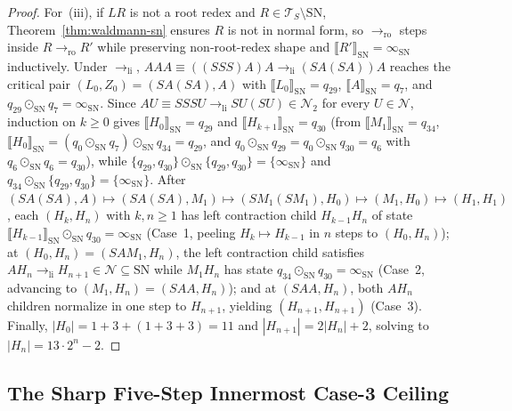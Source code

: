 \documentclass[11pt,reqno]{amsart}
\numberwithin{equation}{section}
\theoremstyle{plain}
\theoremstyle{definition}
\theoremstyle{remark}
\begin{document}
\begin{proof}
For~(iii), if $L R$ is not a root redex and $R \in \mathcal{T}_S \setminus \mathrm{SN}$, Theorem~\ref{thm:waldmann-sn} ensures $R$ is not in normal form, so $\to_{\mathrm{ro}}$ steps inside $R \to_{\mathrm{ro}} R'$ while preserving non-root-redex shape and $\llbracket R' \rrbracket_{\mathrm{SN}} = \infty_{\mathrm{SN}}$ inductively. Under $\to_{\mathrm{li}}$, $A A A \equiv ((S S S) A) A \to_{\mathrm{li}} (S A (S A)) A$ reaches the critical pair $(L_0, Z_0) = (S A (S A), A)$ with $\llbracket L_0 \rrbracket_{\mathrm{SN}} = q_{29}$, $\llbracket A \rrbracket_{\mathrm{SN}} = q_7$, and $q_{29} \odot_{\mathrm{SN}} q_7 = \infty_{\mathrm{SN}}$. Since $A U \equiv S S S U \to_{\mathrm{li}} S U (S U) \in \mathcal{N}_2$ for every $U \in \mathcal{N}$, induction on $k \ge 0$ gives $\llbracket H_0 \rrbracket_{\mathrm{SN}} = q_{29}$ and $\llbracket H_{k+1} \rrbracket_{\mathrm{SN}} = q_{30}$ (from $\llbracket M_1 \rrbracket_{\mathrm{SN}} = q_{34}$, $\llbracket H_0 \rrbracket_{\mathrm{SN}} = (q_0 \odot_{\mathrm{SN}} q_7) \odot_{\mathrm{SN}} q_{34} = q_{29}$, and $q_0 \odot_{\mathrm{SN}} q_{29} = q_0 \odot_{\mathrm{SN}} q_{30} = q_6$ with $q_6 \odot_{\mathrm{SN}} q_6 = q_{30}$), while $\{q_{29}, q_{30}\} \odot_{\mathrm{SN}} \{q_{29}, q_{30}\} = \{\infty_{\mathrm{SN}}\}$ and $q_{34} \odot_{\mathrm{SN}} \{q_{29}, q_{30}\} = \{\infty_{\mathrm{SN}}\}$. After $(S A (S A), A) \mapsto (S A (S A), M_1) \mapsto (S M_1 (S M_1), H_0) \mapsto (M_1, H_0) \mapsto (H_1, H_1)$, each $(H_k, H_n)$ with $k, n \ge 1$ has left contraction child $H_{k-1} H_n$ of state $\llbracket H_{k-1} \rrbracket_{\mathrm{SN}} \odot_{\mathrm{SN}} q_{30} = \infty_{\mathrm{SN}}$ (Case~1, peeling $H_k \mapsto H_{k-1}$ in $n$ steps to $(H_0, H_n)$); at $(H_0, H_n) = (S A M_1, H_n)$, the left contraction child satisfies $A H_n \to_{\mathrm{li}} H_{n+1} \in \mathcal{N} \subseteq \mathrm{SN}$ while $M_1 H_n$ has state $q_{34} \odot_{\mathrm{SN}} q_{30} = \infty_{\mathrm{SN}}$ (Case~2, advancing to $(M_1, H_n) = (S A A, H_n)$); and at $(S A A, H_n)$, both $A H_n$ children normalize in one step to $H_{n+1}$, yielding $(H_{n+1}, H_{n+1})$ (Case~3). Finally, $|H_0| = 1 + 3 + (1 + 3 + 3) = 11$ and $|H_{n+1}| = 2|H_n| + 2$, solving to $|H_n| = 13 \cdot 2^n - 2$.
\end{proof}

\subsection{The Sharp Five-Step Innermost Case-3 Ceiling}
\label{subsec:case3-ceiling}
\end{document}
